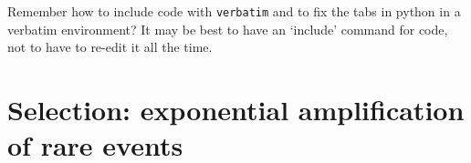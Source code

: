 Remember how to include code with {\tt verbatim} 
and to fix the tabs in {\sf python} in a verbatim environment? 
It may be best to have an `include' command for code, 
not to have to re-edit it all the time.

\section{Selection: exponential amplification of rare events}

